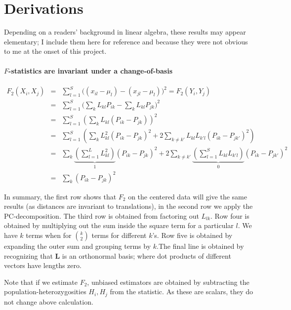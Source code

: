 \documentclass[12pt,fullpage, a4paper]{article}
\newcommand{\ML}{\mathbf{L}} %
\begin{document}
\newpage
%
\printbibliography

\newpage
\appendix
\section{Derivations}\label{appendix:fonpc}
\setcounter{equation}{0}
\renewcommand{\theequation}{\thesection\arabic{equation}}
Depending on a readers' background in linear algebra, these results may appear elementary; I include them here for reference and because they were not obvious to me at the onset of this project.
\paragraph{$F$-statistics are invariant under a change-of-basis}
\begin{eqnarray}
F_2(X_i, X_j) &=& \sum_{l=1}^S \big( (x_{il} - \mu_l) -(x_{jl} -\mu_l)\big)^2 = F_2(Y_i, Y_j)\nonumber\\
&=& \sum_{l=1}^S \big( \sum_k L_{kl}P_{ik} - \sum_kL_{kl}P_{jk}\big)^2\nonumber\\
&=& \sum_{l=1}^S \left( \sum_k L_{kl} (P_{ik} -P_{jk}) \right)^2\nonumber\\
&=& \sum_{l=1}^S \left( \sum_k L_{kl}^2 (P_{ik} -P_{jk})^2 + 2\sum_{k\neq k'} L_{kl}L_{k'l}(P_{ik} - P_{jk'})^2 \right)\nonumber\\
&=& \sum_k \underbrace{\left(\sum_{l=1}^L L_{kl}^2\right)}_1 (P_{ik} -P_{jk})^2 + 2\sum_{k\neq k'}\underbrace{\left(\sum_{l=1}^S L_{kl}L_{k'l}\right)}_{0} (P_{ik} - P_{jk'})^2\nonumber\\
&=& \sum_k (P_{ik} - P_{jk})^2 \label{eq:changeofbasis}
\end{eqnarray}

In summary, the first row shows that $F_2$ on the centered data will give the same results (as distances are invariant to translations), in the second row we apply the PC-decomposition. The third row is obtained from factoring out $L_{lk}$. Row four is obtained by multiplying out the sum inside the square term for a particular $l$. We have $k$ terms when for $\binom{k}{2}$ terms for different $k$'s.  Row five is obtained by expanding the outer sum and grouping terms by $k$.The final line is obtained by recognizing that $\ML$ is an orthonormal basis; where dot products of different vectors have lengths zero.

Note that if we estimate $F_2$, unbiased estimators are obtained by subtracting the population-heterozygosities $H_i, H_j$ from the statistic. As these are scalars, they do not change above calculation.
\end{document}
